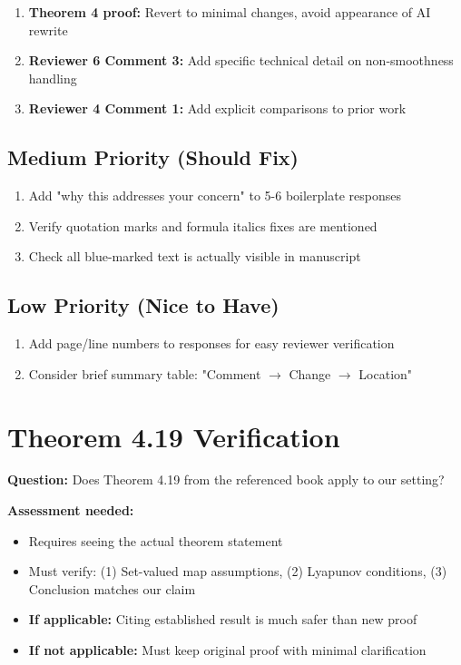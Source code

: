 \documentclass[11pt]{article}
\begin{document}
\begin{enumerate}
\item \textcolor{critical}{\textbf{Theorem 4 proof:}} Revert to minimal changes, avoid appearance of AI rewrite
\item \textcolor{critical}{\textbf{Reviewer 6 Comment 3:}} Add specific technical detail on non-smoothness handling
\item \textcolor{warning}{\textbf{Reviewer 4 Comment 1:}} Add explicit comparisons to prior work
\end{enumerate}

\subsection{Medium Priority (Should Fix)}

\begin{enumerate}
\item Add "why this addresses your concern" to 5-6 boilerplate responses
\item Verify quotation marks and formula italics fixes are mentioned
\item Check all blue-marked text is actually visible in manuscript
\end{enumerate}

\subsection{Low Priority (Nice to Have)}

\begin{enumerate}
\item Add page/line numbers to responses for easy reviewer verification
\item Consider brief summary table: "Comment $\rightarrow$ Change $\rightarrow$ Location"
\end{enumerate}

\section{Theorem 4.19 Verification}

\textbf{Question:} Does Theorem 4.19 from the referenced book apply to our setting?

\textbf{Assessment needed:}
\begin{itemize}
\item Requires seeing the actual theorem statement
\item Must verify: (1) Set-valued map assumptions, (2) Lyapunov conditions, (3) Conclusion matches our claim
\item \textbf{If applicable:} Citing established result is much safer than new proof
\item \textbf{If not applicable:} Must keep original proof with minimal clarification
\end{itemize}
\end{document}
